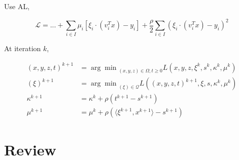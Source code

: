 \documentclass[a4paper, 10pt]{article}
\begin{document}
Use AL,

\begin{equation}
    \mathcal L = ... + \sum_{i \in I} \mu_i \left [\xi_i \cdot(v_i^Tx) - y_i\right] + \frac{\rho}{2}\sum_{i \in I} (\xi_i \cdot (v_i^Tx) - y_i)^2
\end{equation}

At iteration \(k\),

\begin{align*}
    (x,y,z,t)^{k+1} & = {\arg\min}_{(x,y,z)\in\Omega, t\ge 0} L\left(x,y,z,\xi^k,s^k,\kappa^k,\mu^k\right)    \\
    (\xi)^{k+1}     & = {\arg\min}_{(\xi)\in\mathscr{Q}} L\left((x,y,z,t)^{k+1},\xi,s, \kappa^k, \mu^k\right) \\
    \kappa^{k+1}    & = \kappa^k + \rho\left(t^{k+1}-s^{k+1}\right)                                           \\
    \mu^{k+1}       & = \mu^k + \rho\left( \langle\xi^{k+1}, x^{k+1}\rangle - s^{k+1}\right)
\end{align*}





\section{Review}
\end{document}
